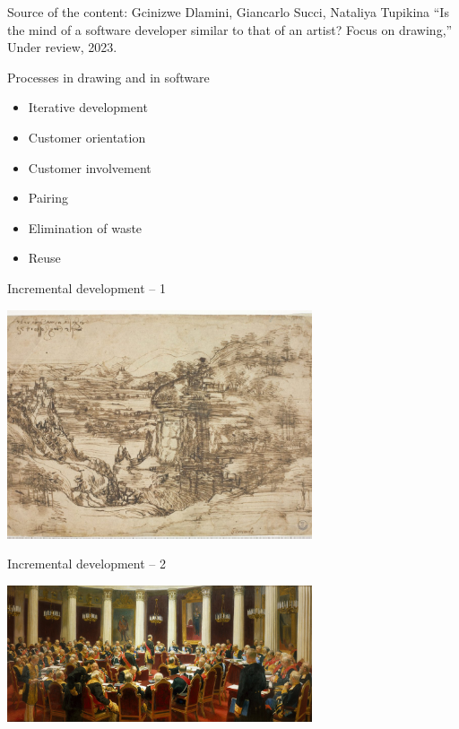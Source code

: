 \documentclass{beamer}
\begin{document}
\begin{frame}
\begin{center}
\tiny
Source of the content: Gcinizwe Dlamini, Giancarlo Succi, Nataliya Tupikina ``Is the mind of a software developer similar to that of an artist? Focus on drawing,'' Under review, 2023.
\end{center}
\end{frame}

\begin{frame}
{\centerline{Processes in drawing and in software}}

\begin{itemize}
\item Iterative development
\item Customer orientation
\item Customer involvement
\item Pairing
\item Elimination of waste
\item Reuse
 \end{itemize}

\end{frame}


\begin{frame}
{\centerline{Incremental development -- 1}}

\begin{center}
\includegraphics[width=9cm]{P2023.AIBCCSS.Drawing/Leonardo.jpg}
\end{center}

\end{frame}

\begin{frame}
{\centerline{Incremental development -- 2}}

\begin{center}
\includegraphics[width=9cm]{P2023.AIBCCSS.Drawing/zasedanie.jpg}
\end{center}

\end{frame}
\end{document}

